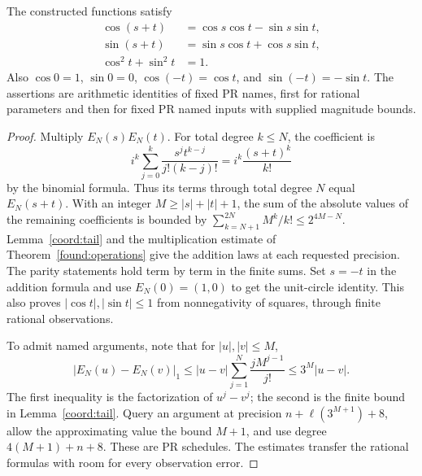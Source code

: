 \begin{theorem}
\label{coord:addition}
The constructed functions satisfy
\begin{align*}
 \cos(s+t)&=\cos s\cos t-\sin s\sin t,\\
 \sin(s+t)&=\sin s\cos t+\cos s\sin t,\\
 \cos^2t+\sin^2t&=1.
\end{align*}
Also $\cos0=1$, $\sin0=0$, $\cos(-t)=\cos t$, and
$\sin(-t)=-\sin t$. The assertions are arithmetic identities of fixed PR
names, first for rational parameters and then for fixed PR named inputs
with supplied magnitude bounds.
\end{theorem}
\begin{proof}
Multiply $E_N(s)E_N(t)$. For total degree $k\le N$, the coefficient is
\[
 i^k\sum_{j=0}^k\frac{s^jt^{k-j}}{j!(k-j)!}
       =i^k\frac{(s+t)^k}{k!}
\]
by the binomial formula. Thus its terms through total degree $N$ equal
$E_N(s+t)$. With an integer $M\ge|s|+|t|+1$, the sum of the absolute
values of the remaining coefficients is bounded by
$\sum_{k=N+1}^{2N}M^k/k!\le2^{4M-N}$.
Lemma~\ref{coord:tail} and the multiplication estimate of
Theorem~\ref{found:operations} give the addition laws at each requested
precision. The parity statements hold term by term in the finite sums.
Set $s=-t$ in the addition formula and use $E_N(0)=(1,0)$ to get the
unit-circle identity. This also proves $|\cos t|,|\sin t|\le1$ from
nonnegativity of squares, through finite rational observations.

To admit named arguments, note that for $|u|,|v|\le M$,
\[
 |E_N(u)-E_N(v)|_1
 \le |u-v|\sum_{j=1}^N\frac{jM^{j-1}}{j!}
 \le3^M|u-v|.
\]
The first inequality is the factorization of $u^j-v^j$; the second is
the finite bound in Lemma~\ref{coord:tail}. Query an argument at precision
$n+\ell(3^{M+1})+8$, allow the approximating value the bound $M+1$,
and use degree $4(M+1)+n+8$. These are PR schedules. The estimates
transfer the rational formulas with room for every observation error.
\end{proof}

